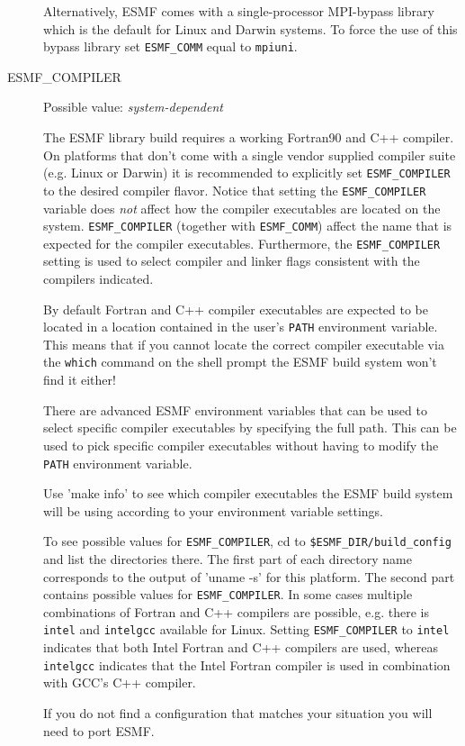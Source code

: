 \begin{description}
Alternatively, ESMF comes with a single-processor MPI-bypass library which is
the default for Linux and Darwin systems. To force the use of this bypass
library set {\tt ESMF\_COMM} equal to {\tt mpiuni}.

\item[ESMF\_COMPILER]
Possible value: {\em system-dependent}

The ESMF library build requires a working Fortran90 and C++ compiler. On
platforms that don't come with a single vendor supplied compiler suite
(e.g. Linux or Darwin) it is recommended to explicitly set {\tt ESMF\_COMPILER}
to the desired compiler flavor. Notice that setting
the {\tt ESMF\_COMPILER} variable does {\em not} affect how the compiler
executables are located on the system. {\tt ESMF\_COMPILER} (together with
{\tt ESMF\_COMM}) affect the name that is expected for the compiler executables.
Furthermore, the {\tt ESMF\_COMPILER} setting is used to select compiler and
linker flags consistent with the compilers indicated.

By default Fortran and C++ compiler executables are expected to be located in
a location contained in the user's {\tt PATH} environment variable. This means
that if you cannot locate the correct compiler executable via the {\tt which}
command on the shell prompt the ESMF build system won't find it either!

There are advanced ESMF environment variables that can be used to select
specific compiler executables by specifying the full path. This can be used to
pick specific compiler executables without having to modify the {\tt PATH}
environment variable.

Use 'make info' to see which compiler executables the ESMF build system will
be using according to your environment variable settings.

To see possible values for {\tt ESMF\_COMPILER}, cd to
{\tt \$ESMF\_DIR/build\_config} and list the directories there. The first part
of each directory name corresponds to the output of 'uname -s' for this
platform. The second part contains possible values for {\tt ESMF\_COMPILER}. In
some cases multiple combinations of Fortran and C++ compilers are possible, e.g.
there is {\tt intel} and {\tt intelgcc} available for Linux. Setting
{\tt ESMF\_COMPILER} to {\tt intel} indicates that both Intel Fortran and
C++ compilers are used, whereas {\tt intelgcc} indicates that the Intel Fortran
compiler is used in combination with GCC's C++ compiler.

If you do not find a configuration that matches your situation you will need to
port ESMF.


\end{description}
